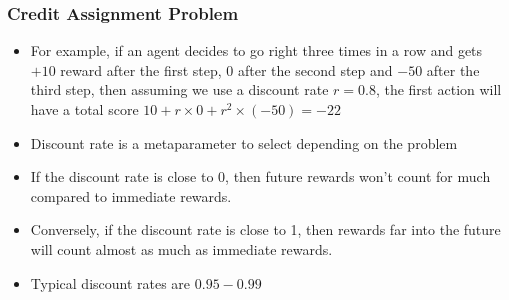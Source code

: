 \begin{frame}[fragile]
  \frametitle{Credit Assignment Problem}
  \begin{itemize}
    \item For example, if an agent decides to go right three times in a row and gets $+10$ reward after the first step, $0$ after the second step and $-50$ after the third step, then assuming we use a discount rate $r=0.8$,
      the first action will have a total score $10+r\times0 + r^2 \times (-50) = -22$
    \item Discount rate is a metaparameter to select depending on the problem
    \item If the discount rate is close to 0, then future rewards won't count for much compared to immediate rewards.
    \item Conversely, if the discount rate is close to 1, then rewards far into the future will count almost as much as immediate rewards.
    \item Typical discount rates are $0.95-0.99$
\end{itemize}
\end{frame}